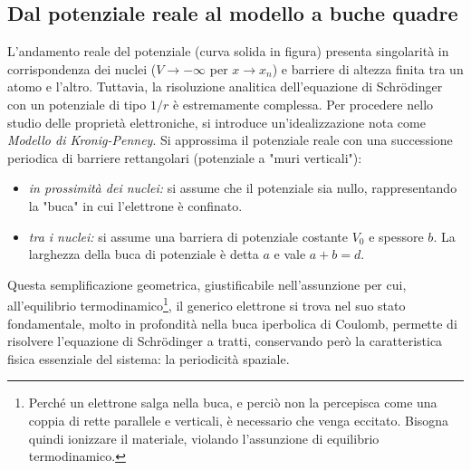 \documentclass[a4paper,11pt]{report}
\begin{document}
\subsection{Dal potenziale reale al modello a buche quadre}
L'andamento reale del potenziale (curva solida in figura) presenta singolarità in corrispondenza dei nuclei ($V \to -\infty$ per $x \to x_n$) e barriere di altezza finita tra un atomo e l'altro.
Tuttavia, la risoluzione analitica dell'equazione di Schrödinger con un potenziale di tipo $1/r$ è estremamente complessa.
Per procedere nello studio delle proprietà elettroniche, si introduce un'idealizzazione nota come \textit{Modello di Kronig-Penney}. Si approssima il potenziale reale con una successione periodica di barriere rettangolari (potenziale a "muri verticali"):
\begin{itemize}
    \item \textit{in prossimità dei nuclei:} si assume che il potenziale sia nullo, rappresentando la "buca" in cui l'elettrone è confinato.
    \item \textit{tra i nuclei:} si assume una barriera di potenziale costante $V_0$ e spessore $b$. La larghezza della buca di potenziale è detta $a$ e vale $a+b = d$.
\end{itemize}
Questa semplificazione geometrica, giustificabile nell'assunzione per cui, all'equilibrio termodinamico\footnote{Perché un elettrone salga nella buca, e perciò non la percepisca come una coppia di rette parallele e verticali, è necessario che venga eccitato. Bisogna quindi ionizzare il materiale, violando l'assunzione di equilibrio termodinamico.}, il generico elettrone si trova nel suo stato fondamentale, molto in profondità nella buca iperbolica di Coulomb, permette di risolvere l'equazione di Schrödinger a tratti, conservando però la caratteristica fisica essenziale del sistema: la periodicità spaziale.
\end{document}
